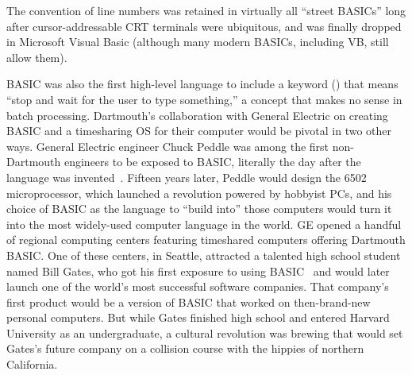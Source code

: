   \begin{tangent}
  The convention of line numbers was retained in virtually all ``street
  BASICs'' long after cursor-addressable CRT terminals were ubiquitous,
  and was finally dropped in Microsoft Visual Basic (although many modern
  BASICs, including VB, still allow them).
  \end{tangent}

BASIC was also the first high-level language to include a keyword
() that means ``stop and wait for
the user to type something,'' a concept that makes no sense in batch
processing. 
Dartmouth's collaboration with General Electric on creating BASIC and
a timesharing OS for their computer would be pivotal in two other
ways.
General Electric engineer Chuck Peddle was among the first
non-Dartmouth engineers to be exposed to BASIC, literally the day
after the language was invented~\cite[p.~5]{commodore}.
Fifteen years later, Peddle would design the 6502 microprocessor,
which launched a revolution powered by hobbyist PCs, and his choice of
BASIC as the language to ``build into'' those computers would turn it
into the most widely-used computer language in the world.
GE opened a handful of regional computing centers featuring timeshared
computers offering Dartmouth BASIC.
One of these centers, in Seattle, attracted a talented high school
student named Bill Gates, who got his first exposure to using
BASIC~\cite{basic_history_gdm} and would later launch one of the
world's most successful software companies.
That company's first product would be a version of BASIC that worked
on then-brand-new personal computers.
But while Gates finished high school and entered Harvard University as
an undergraduate, a cultural revolution was brewing that would set
Gates's future company on a collision course with the hippies of
northern California.





